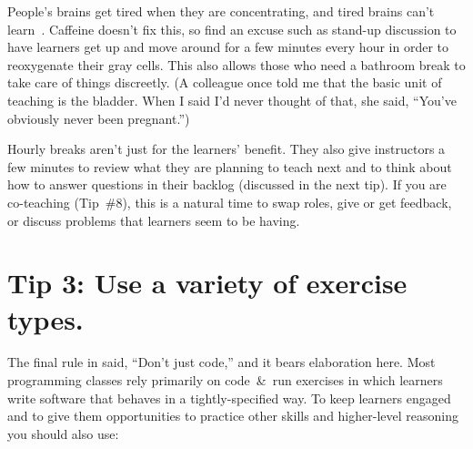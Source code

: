\documentclass[10pt,letterpaper]{article}
\newcommand{\rulemajor}[1]{\section{#1}}
\begin{document}
People's brains get tired when they are concentrating,
and tired brains can't learn~\cite{HPL2}.
Caffeine doesn't fix this,
so find an excuse such as stand-up discussion
to have learners get up and move around for a few minutes every hour
in order to reoxygenate their gray cells.
This also allows those who need a bathroom break to take care of things discreetly.
(A colleague once told me that
the basic unit of teaching is the bladder.
When I said I'd never thought of that,
she said, ``You've obviously never been pregnant.'')

Hourly breaks aren't just for the learners' benefit.
They also give instructors a few minutes to review what they are planning to teach next
and to think about how to answer questions in their backlog (discussed in the next tip).
If you are co-teaching (Tip~\#8),
this is a natural time to swap roles,
give or get feedback,
or discuss problems that learners seem to be having.

\rulemajor{Tip 3: Use a variety of exercise types.}

The final rule in \cite{Brow2018} said,
``Don't just code,''
and it bears elaboration here.
Most programming classes rely primarily on code~\&~run exercises
in which learners write software that behaves in a tightly-specified way.
To keep learners engaged
and to give them opportunities to practice other skills and higher-level reasoning
you should also use:
\end{document}
